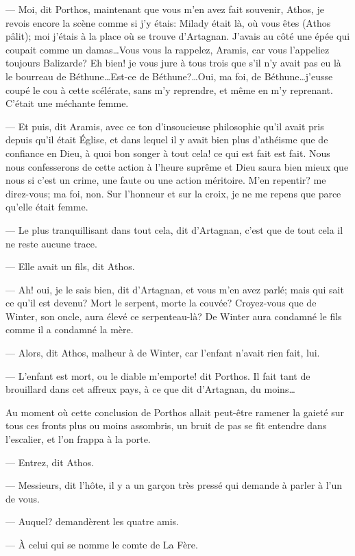 — Moi, dit Porthos, maintenant que vous m'en avez fait souvenir, Athos, je revois encore la scène comme si j'y étais: Milady était là, où vous êtes (Athos pâlit); moi j'étais à la place où se trouve d'Artagnan. J'avais au côté une épée qui coupait comme un damas\dots Vous vous la rappelez, Aramis, car vous l'appeliez toujours Balizarde? Eh bien! je vous jure à tous trois que s'il n'y avait pas eu là le bourreau de Béthune\dots Est-ce de Béthune?\dots Oui, ma foi, de Béthune\dots j'eusse coupé le cou à cette scélérate, sans m'y reprendre, et même en m'y reprenant. C'était une méchante femme.

— Et puis, dit Aramis, avec ce ton d'insoucieuse philosophie qu'il avait pris depuis qu'il était Église, et dans lequel il y avait bien plus d'athéisme que de confiance en Dieu, à quoi bon songer à tout cela! ce qui est fait est fait. Nous nous confesserons de cette action à l'heure suprême et Dieu saura bien mieux que nous si c'est un crime, une faute ou une action méritoire. M'en repentir? me direz-vous; ma foi, non. Sur l'honneur et sur la croix, je ne me repens que parce qu'elle était femme.

— Le plus tranquillisant dans tout cela, dit d'Artagnan, c'est que de tout cela il ne reste aucune trace.

— Elle avait un fils, dit Athos.

— Ah! oui, je le sais bien, dit d'Artagnan, et vous m'en avez parlé; mais qui sait ce qu'il est devenu? Mort le serpent, morte la couvée? Croyez-vous que de Winter, son oncle, aura élevé ce serpenteau-là? De Winter aura condamné le fils comme il a condamné la mère.

— Alors, dit Athos, malheur à de Winter, car l'enfant n'avait rien fait, lui.

— L'enfant est mort, ou le diable m'emporte! dit Porthos. Il fait tant de brouillard dans cet affreux pays, à ce que dit d'Artagnan, du moins\dots

Au moment où cette conclusion de Porthos allait peut-être ramener la gaieté sur tous ces fronts plus ou moins assombris, un bruit de pas se fit entendre dans l'escalier, et l'on frappa à la porte.

— Entrez, dit Athos.

— Messieurs, dit l'hôte, il y a un garçon très pressé qui demande à parler à l'un de vous.

— Auquel? demandèrent les quatre amis.

— À celui qui se nomme le comte de La Fère.

